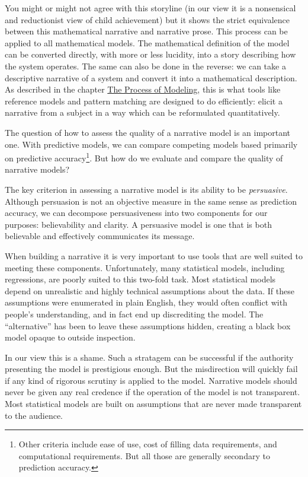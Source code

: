 \documentclass[]{memoir}
\begin{document}
You might or might not agree with this storyline (in our view it is a
nonsensical and reductionist view of child achievement) but it shows the
strict equivalence between this mathematical narrative and narrative
prose. This process can be applied to all mathematical models. The
mathematical definition of the model can be converted directly, with
more or less lucidity, into a story describing how the system operates.
The same can also be done in the reverse: we can take a descriptive
narrative of a system and convert it into a mathematical description. As
described in the chapter \hyperref[ModelingProcess]{The Process of
Modeling}, this is what tools like reference models and pattern matching
are designed to do efficiently: elicit a narrative from a subject in a
way which can be reformulated quantitatively.

The question of how to assess the quality of a narrative model is an
important one. With predictive models, we can compare competing models
based primarily on predictive accuracy\footnote{Other criteria include
  ease of use, cost of filling data requirements, and computational
  requirements. But all those are generally secondary to prediction
  accuracy.}. But how do we evaluate and compare the quality of
narrative models?

The key criterion in assessing a narrative model is its ability to be
\emph{persuasive}. Although persuasion is not an objective measure in
the same sense as prediction accuracy, we can decompose persuasiveness
into two components for our purposes: believability and clarity. A
persuasive model is one that is both believable and effectively
communicates its message.

When building a narrative it is very important to use tools that are
well suited to meeting these components. Unfortunately, many statistical
models, including regressions, are poorly suited to this two-fold task.
Most statistical models depend on unrealistic and highly technical
assumptions about the data. If these assumptions were enumerated in
plain English, they would often conflict with people's understanding,
and in fact end up discrediting the model. The ``alternative'' has been
to leave these assumptions hidden, creating a black box model opaque to
outside inspection.

In our view this is a shame. Such a stratagem can be successful if the
authority presenting the model is prestigious enough. But the
misdirection will quickly fail if any kind of rigorous scrutiny is
applied to the model. Narrative models should never be given any real
credence if the operation of the model is not transparent. Most
statistical models are built on assumptions that are never made
transparent to the audience.
\end{document}
